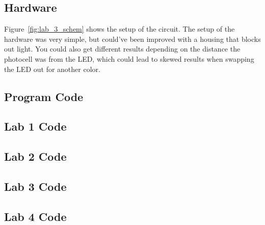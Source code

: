 \documentclass[12pt,titlepage]{article}
\begin{document}
\subsection{Hardware}
Figure~\ref{fig:lab_3_schem} shows the setup of the circuit. The setup of the hardware was very simple, but
could've been improved with a housing that blocks out light. You could also get different results depending
on the distance the photocell was from the LED, which could lead to skewed results when swapping the LED out
for another color.
\clearpage
\begin{appendices}
  \section{Program Code}
  \subsection{Lab 1 Code}
  \begin{minipage}{\linewidth}
    
  \end{minipage} 
  \begin{minipage}{\linewidth}
    
  \end{minipage} 
  \subsection{Lab 2 Code}
    
  \subsection{Lab 3 Code}
    
  \subsection{Lab 4 Code}
    
    
\end{appendices}
\end{document}
